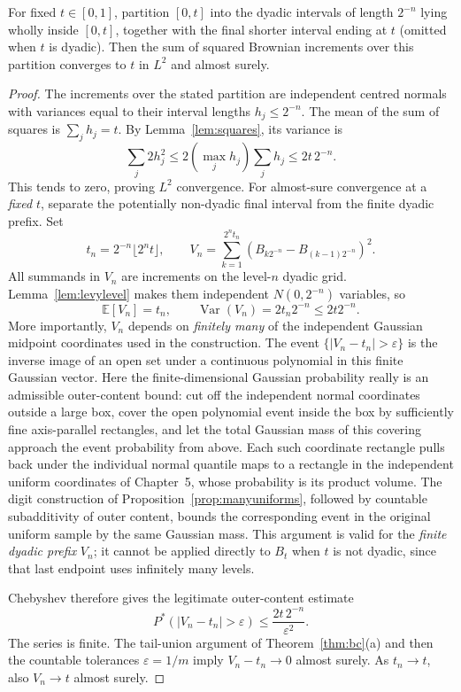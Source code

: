 \begin{theorem}\label{thm:qv}
For fixed $t\in[0,1]$, partition $[0,t]$ into the dyadic intervals of length $2^{-n}$ lying wholly inside $[0,t]$, together with the final shorter interval ending at $t$ (omitted when $t$ is dyadic). Then the sum of squared Brownian increments over this partition converges to $t$ in $L^2$ and almost surely.
\end{theorem}
\begin{proof}
The increments over the stated partition are independent centred normals with variances equal to their interval lengths $h_j\le2^{-n}$. The mean of the sum of squares is $\sum_jh_j=t$. By Lemma~\ref{lem:squares}, its variance is
\[
\sum_j2h_j^2\le2(\max_jh_j)\sum_jh_j\le 2t\,2^{-n}.
\]
This tends to zero, proving $L^2$ convergence. For almost-sure convergence at a \emph{fixed} $t$, separate the potentially non-dyadic final interval from the finite dyadic prefix. Set
\[
 t_n=2^{-n}\lfloor2^nt\rfloor,\qquad
 V_n=\sum_{k=1}^{2^n t_n}(B_{k2^{-n}}-B_{(k-1)2^{-n}})^2.
\]
All summands in $V_n$ are increments on the level-$n$ dyadic grid. Lemma~\ref{lem:levylevel} makes them independent $N(0,2^{-n})$ variables, so
\[
 \mathbb E[V_n]=t_n,\qquad
 \operatorname{Var}(V_n)=2t_n2^{-n}\le2t2^{-n}.
\]
More importantly, $V_n$ depends on \emph{finitely many} of the independent Gaussian midpoint coordinates used in the construction. The event $\{|V_n-t_n|>\varepsilon\}$ is the inverse image of an open set under a continuous polynomial in this finite Gaussian vector. Here the finite-dimensional Gaussian probability really is an admissible outer-content bound: cut off the independent normal coordinates outside a large box, cover the open polynomial event inside the box by sufficiently fine axis-parallel rectangles, and let the total Gaussian mass of this covering approach the event probability from above. Each such coordinate rectangle pulls back under the individual normal quantile maps to a rectangle in the independent uniform coordinates of Chapter~5, whose probability is its product volume. The digit construction of Proposition~\ref{prop:manyuniforms}, followed by countable subadditivity of outer content, bounds the corresponding event in the original uniform sample by the same Gaussian mass. This argument is valid for the \emph{finite dyadic prefix} $V_n$; it cannot be applied directly to $B_t$ when $t$ is not dyadic, since that last endpoint uses infinitely many levels.

Chebyshev therefore gives the legitimate outer-content estimate
\[
 P^*(|V_n-t_n|>\varepsilon)\le \frac{2t\,2^{-n}}{\varepsilon^2}.
\]
The series is finite. The tail-union argument of Theorem~\ref{thm:bc}(a) and then the countable tolerances $\varepsilon=1/m$ imply $V_n-t_n\to0$ almost surely. As $t_n\to t$, also $V_n\to t$ almost surely.


\end{proof}
